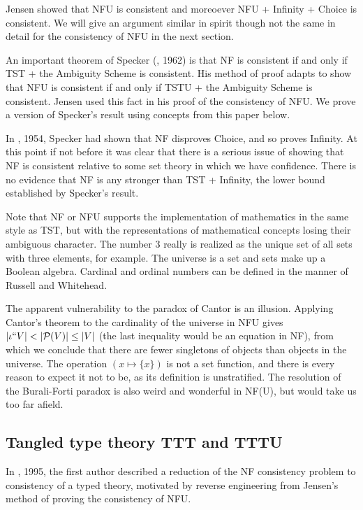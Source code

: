 \documentclass[112pt]{article}
\theoremstyle{definition}
\theoremstyle{remark}
\begin{document}
Jensen showed that NFU is consistent and moreoever NFU + Infinity + Choice is consistent.  We will give an argument similar in spirit though not the same in detail for the consistency of NFU in the next section.

An important theorem of Specker (\cite{ambiguity}, 1962) is that NF is consistent if and only if TST + the Ambiguity Scheme is consistent.  His method of proof adapts to show that  NFU is consistent if and only if TSTU + the Ambiguity Scheme is consistent.  Jensen used this fact in his proof of the consistency of NFU.  We prove a version of Specker's result using concepts from this paper below.

In \cite{notac}, 1954, Specker had shown that NF disproves Choice, and so proves Infinity.  At this point if not before it was clear that there is a serious issue of showing that NF is consistent relative to some set theory in which we have confidence.  There is no evidence that NF is any stronger than TST + Infinity, the lower bound established by Specker's result.

Note that NF or NFU supports the implementation of mathematics in the same style as TST, but with the representations of mathematical concepts losing their ambiguous character.  The number 3 really is realized as the unique set of all sets with three elements, for example.  The universe is a set and sets make up a Boolean algebra.   Cardinal and ordinal numbers can be defined
in the manner of Russell and Whitehead.

The apparent vulnerability to the paradox of Cantor is an illusion.  Applying Cantor's theorem to the cardinality of the universe in NFU gives $|\iota``V| < |{\cal P}(V)| \leq |V|$ (the last inequality would be an equation in NF), from which we conclude that there are fewer singletons of objects than objects in the universe.  The operation $(x \mapsto \{x\})$ is not a set function, and there is every reason to expect it not to be, as its definition is unstratified.  The resolution of the Burali-Forti paradox is also weird and wonderful in NF(U), but would take us too far afield.

\newpage

\subsection{Tangled type theory TTT and TTTU}

In \cite{tangled}, 1995, the first author described a reduction of the NF consistency problem to consistency of a typed theory,  motivated by reverse engineering from Jensen's method of proving the consistency of NFU.
\end{document}
